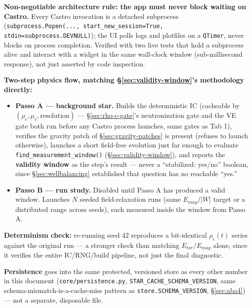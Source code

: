 \documentclass[11pt,a4paper]{scrartcl}
\newcommand{\code}[1]{\texttt{\small #1}}
\begin{document}
\textbf{Non-negotiable architecture rule: the app must never block
waiting on Castro.} Every Castro invocation is a detached subprocess
(\code{subprocess.Popen(..., start\_new\_session=True,
stdin=subprocess.DEVNULL)}); the UI polls logs and plotfiles on a
\code{QTimer}, never blocks on process completion. Verified with two
live tests that hold a subprocess alive and interact with a widget in
the same wall-clock window (sub-millisecond response), not just
asserted by code inspection.

\textbf{Two-step physics flow, matching \S\ref{sec:validity-window}'s
methodology directly:}
\begin{itemize}[leftmargin=1.4em,itemsep=0.3em]
\item \textbf{Passo A --- background star.} Builds the deterministic IC
  (cacheable by $(\rho_c,\mu_e,\text{resolution})$ --- \S\ref{sec:rho-c-gate}'s
  neutronization gate and the VE gate both run before any Castro
  process launches, same gates as Tab 1), verifies the gravity patch of
  \S\ref{sec:gravity-patches} is present (refuses to launch otherwise),
  launches a short field-free evolution just far enough to evaluate
  \code{find\_measurement\_window()} (\S\ref{sec:validity-window}), and
  reports the \textbf{validity window} as the step's result --- never a
  ``stabilized: yes/no'' boolean, since \S\ref{sec:wellbalancing}
  established that question has no reachable ``yes.''
\item \textbf{Passo B --- run study.} Disabled until Passo A has
  produced a valid window. Launches $N$ seeded field-relaxation runs
  (same $E_{mag}/|W|$ target or a distributed range across seeds), each
  measured inside the window from Passo A.
\end{itemize}

\textbf{Determinism check:} re-running seed 42 reproduces a
bit-identical $\rho_c(t)$ series against the original run --- a
stronger check than matching $E_{tor}/E_{mag}$ alone, since it verifies
the entire IC/RNG/build pipeline, not just the final diagnostic.

\textbf{Persistence} goes into the same protected, versioned store as
every other number in this document (\code{core/persistence.py},
\code{STAR\_CACHE\_SCHEMA\_VERSION}, same schema-mismatch-is-a-cache-miss
pattern as \code{store.SCHEMA\_VERSION}, \S\ref{sec:aba4}) --- not a
separate, disposable file.
\end{document}
